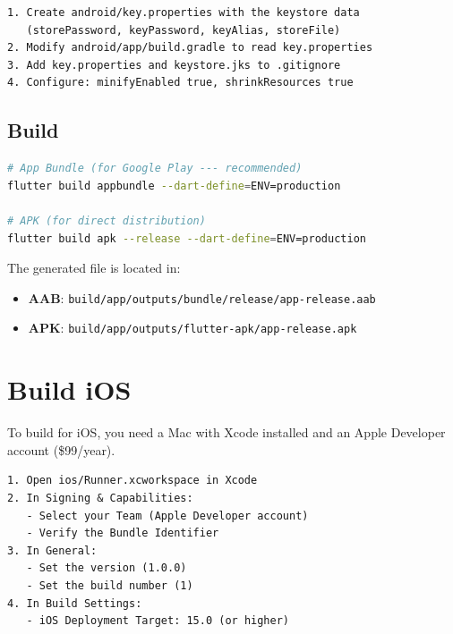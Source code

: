 \begin{praticabox}[title={Hands-on --- Configure signing}]
\begin{lstlisting}[language={}]
1. Create android/key.properties with the keystore data
   (storePassword, keyPassword, keyAlias, storeFile)
2. Modify android/app/build.gradle to read key.properties
3. Add key.properties and keystore.jks to .gitignore
4. Configure: minifyEnabled true, shrinkResources true
\end{lstlisting}
\end{praticabox}

\subsection{Build}

\begin{lstlisting}[language=bash]
# App Bundle (for Google Play --- recommended)
flutter build appbundle --dart-define=ENV=production

# APK (for direct distribution)
flutter build apk --release --dart-define=ENV=production
\end{lstlisting}

The generated file is located in:
\begin{itemize}
  \item \textbf{AAB}: \texttt{build/app/outputs/bundle/release/app-release.aab}
  \item \textbf{APK}: \texttt{build/app/outputs/flutter-apk/app-release.apk}
\end{itemize}

\section{Build iOS}

\begin{warnbox}
To build for iOS, you need a Mac with Xcode installed and an Apple Developer account (\$99/year).
\end{warnbox}

\begin{praticabox}[title={Hands-on --- Xcode configuration}]
\begin{lstlisting}[language={}]
1. Open ios/Runner.xcworkspace in Xcode
2. In Signing & Capabilities:
   - Select your Team (Apple Developer account)
   - Verify the Bundle Identifier
3. In General:
   - Set the version (1.0.0)
   - Set the build number (1)
4. In Build Settings:
   - iOS Deployment Target: 15.0 (or higher)
\end{lstlisting}
\end{praticabox}

